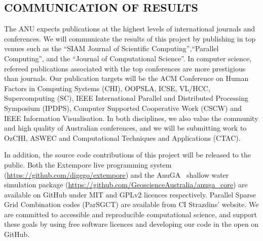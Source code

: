 \subsection*{COMMUNICATION OF RESULTS}

The ANU expects publications at the highest levels of international
journals and conferences. We will communicate the results of this
project by publishing in top venues such as the ``SIAM Journal of
Scientific Computing'',``Parallel Computing'', and the ``Journal of
Computational Science''. In computer science, refereed publications
associated with the top conferences are more prestigious than
journals. Our publication targets will be the ACM Conference on Human
Factors in Computing Systems (CHI), OOPSLA, ICSE, VL/HCC,
Supercomputing (SC), IEEE International Parallel and Distributed
Processing Symposium (IPDPS), Computer Supported Cooperative Work
(CSCW) and IEEE Information Visualisation. In both disciplines, we
also value the community and high quality of Australian conferences,
and we will be submitting work to OzCHI, ASWEC and Computational
Techniques and Applications (CTAC).


In addition, the source code contributions of this project will be
released to the public. Both the Extempore live programming system
(\url{https://github.com/digego/extempore}) and the
 AnuGA~\parencite{anugamanual,nielsen2005hydrodynamic} 
shallow
water simulation package
(\url{https://github.com/GeoscienceAustralia/anuga_core}) are
available on GitHub under MIT and GPLv2 licences respectively.
Parallel Sparse Grid Combination codes (ParSGCT) are available from CI
Strazdins' website.  We are committed to accessible and reproducible
computational science, and support these goals by using free software
licences and developing our code in the open on GitHub.

